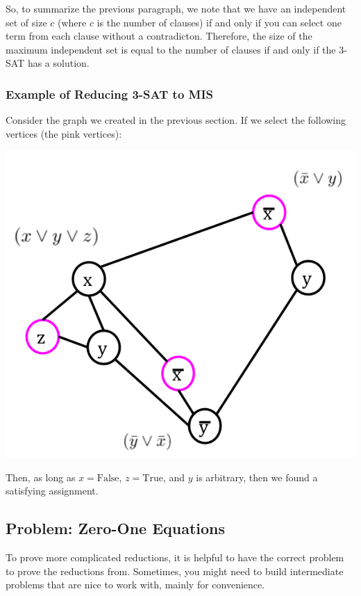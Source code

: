 \documentclass[letterpaper]{article}
\begin{document}
\bigskip 

So, to summarize the previous paragraph, we note that we have an independent set of size $c$ (where $c$ is the number of clauses) if and only if you can select one term from each clause without a contradicton. Therefore, the size of the maximum independent set is equal to the number of clauses if and only if the 3-SAT has a solution. 

\subsubsection{Example of Reducing 3-SAT to MIS}
Consider the graph we created in the previous section. If we select the following vertices (the pink vertices): 
\begin{center}
    \includegraphics[scale=0.4]{../assets/3sat_mis_4.png}
\end{center}
Then, as long as $x = \text{False}$, $z = \text{True}$, and $y$ is arbitrary, then we found a satisfying assignment. 


\subsection{Problem: Zero-One Equations}
To prove more complicated reductions, it is helpful to have the correct problem to prove the reductions from. Sometimes, you might need to build intermediate problems that are nice to work with, mainly for convenience. 
\end{document}
